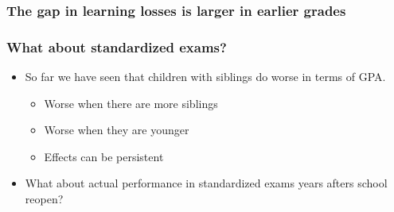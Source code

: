 \documentclass{beamer}
\begin{document}
\begin{frame}
    \label{frame:twfe_gpa_2_4_6_8}
    \frametitle{The gap in learning losses is larger in earlier grades}
        {
    }
\end{frame}

\begin{frame}
    \label{frame:recap1}
    \frametitle{What about standardized exams?}
    \begin{itemize}
       \item So far we have seen that children with siblings do worse in terms of GPA.
        \begin{itemize}
            \item Worse when there are more siblings
            \item Worse when they are younger
            \item Effects can be persistent
        \end{itemize}
        \item What about actual performance in standardized exams years afters school reopen?
    \end{itemize}
\end{frame}
\end{document}
